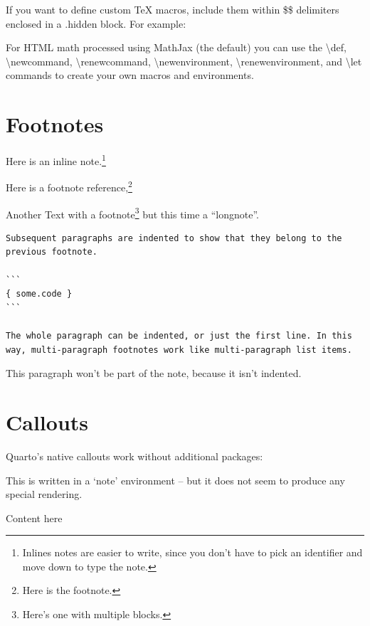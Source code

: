 \documentclass[
  11pt,
  letterpaper,
]{book}
\begin{document}
If you want to define custom TeX macros, include them within \$\$
delimiters enclosed in a .hidden block. For example:

For HTML math processed using MathJax (the default) you can use the
\textbackslash def, \textbackslash newcommand,
\textbackslash renewcommand, \textbackslash newenvironment,
\textbackslash renewenvironment, and \textbackslash let commands to
create your own macros and environments.

\section{Footnotes}\label{footnotes-1}

Here is an inline note.\footnote{Inlines notes are easier to write,
  since you don't have to pick an identifier and move down to type the
  note.}

Here is a footnote reference,\footnote{Here is the footnote.}

Another Text with a footnote\footnote{Here's one with multiple blocks.}
but this time a ``longnote''.

\begin{verbatim}
Subsequent paragraphs are indented to show that they belong to the previous footnote.

```         
{ some.code }
```

The whole paragraph can be indented, or just the first line. In this way, multi-paragraph footnotes work like multi-paragraph list items.
\end{verbatim}

This paragraph won't be part of the note, because it isn't indented.

\section{Callouts}\label{sec-callouts}

Quarto's native callouts work without additional packages:

This is written in a `note' environment -- but it does not seem to
produce any special rendering.

\begin{tcolorbox}[enhanced jigsaw, coltitle=black, opacitybacktitle=0.6, titlerule=0mm, colframe=quarto-callout-note-color-frame, breakable, leftrule=.75mm, colback=white, left=2mm, opacityback=0, colbacktitle=quarto-callout-note-color!10!white, bottomtitle=1mm, toptitle=1mm, title=\textcolor{quarto-callout-note-color}{\faInfo}\hspace{0.5em}{Optional Title}, arc=.35mm, bottomrule=.15mm, rightrule=.15mm, toprule=.15mm]

Content here

\end{tcolorbox}
\end{document}

